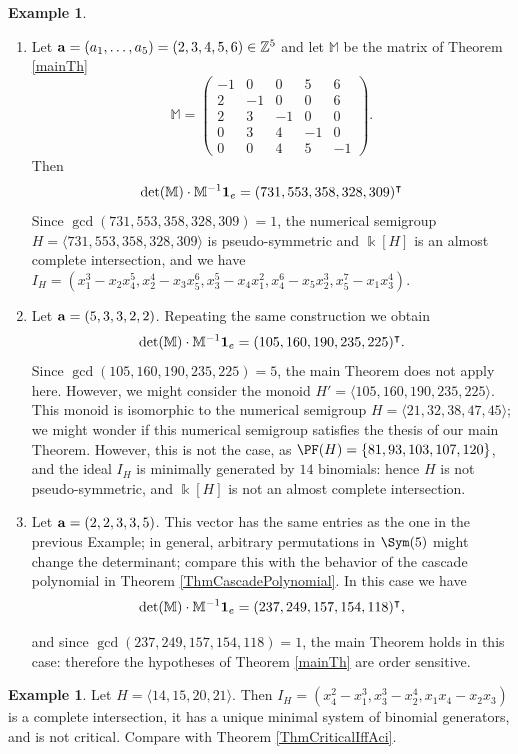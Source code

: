 \documentclass[11pt,twoside]{amsart}
\def\bbM{{\mathbb M}}
\theoremstyle{definition}
\newtheorem{ex}[Theorem]{Example}
\numberwithin{equation}{section}
\begin{document}
\begin{ex} \label{gcd hyp}
\begin{enumerate}
\item Let ${\bf a}=(a_1,\ldots,a_5)=(2,3,4,5,6) \in \mathbb{Z}^5$ and let $\mathbb{M}$ be the matrix of Theorem \ref{mainTh}
\[ \mathbb{M}=\begin{pmatrix}
-1 & 0 & 0 & 5 & 6 \\
2 & -1 & 0 & 0 & 6 \\
2 & 3 & -1 & 0 & 0 \\
0 & 3 & 4 & -1 & 0 \\
0 & 0 & 4 & 5 & -1 
\end{pmatrix}.
\]
Then
\[ \det(\bbM) \cdot \bbM^{-1}{\bf 1}_e = (731,553,358,328,309)^\intercal\]
Since $\gcd(731,553,358,328,309)=1$, the numerical semigroup $H = \langle 731,553,358,328,309 \rangle$ is pseudo-symmetric and $\Bbbk[H]$ is an almost complete intersection, and we have $I_H= (x_1^3-x_2x_4^5,x_2^4-x_3x_5^6,x_3^5-x_4x_1^2,x_4^6-x_5x_2^3, x_5^7-x_1x_3^4)$.
\item Let ${\bf a}=(5,3,3,2,2)$. Repeating the same construction we obtain \[ \det(\bbM) \cdot \bbM^{-1}{\bf 1}_e =  (105,160,190,235,225)^\intercal.\]
Since $\gcd(105,160,190,235,225)=5$, the main Theorem does not apply here. However, we might consider the monoid $H' = \langle 105,160,190,235,225 \rangle$. This monoid is isomorphic to the numerical semigroup $H = \langle 21,32,38,47,45 \rangle$; we might wonder if this numerical semigroup satisfies the thesis of our main Theorem. However, this is not the case, as $\PF(H)=\{81,93,103,107,120\}$, and the ideal $I_H$ is minimally generated by $14$ binomials: hence $H$ is not pseudo-symmetric, and $\Bbbk[H]$ is not an almost complete intersection.
\item Let ${\bf a}=(2,2,3,3,5)$. This vector has the same entries as the one in the previous Example; in general, arbitrary permutations in $\Sym(5)$ might change the determinant; compare this with the behavior of the cascade polynomial in Theorem \ref{ThmCascadePolynomial}. In this case we have
\[ \det(\bbM) \cdot \bbM^{-1}{\bf 1}_e =  (237,249,157,154,118)^\intercal,\]

and since $\gcd(237,249,157,154,118)=1$, the main Theorem holds in this case: therefore the hypotheses of Theorem \ref{mainTh} are order sensitive.
\end{enumerate}
\end{ex}


\begin{ex}\label{symnotcrit}
Let $H=\langle 14,15,20,21 \rangle$. Then $I_H=(x_4^2-x_1^3,x_3^3-x_2^4,x_1x_4-x_2x_3)$ is a complete intersection, it has a unique minimal system of binomial generators, and is not critical.
Compare with Theorem \ref{ThmCriticalIffAci}.
\end{ex}
\end{document}
